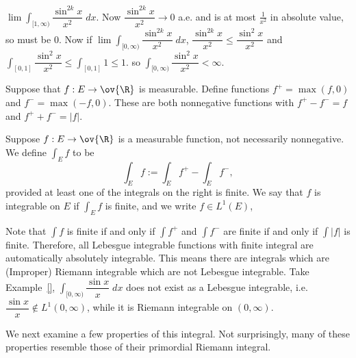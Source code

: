 \begin{ex}
$\lim \int_{[1,\infty)} \dfrac{\sin^{2k} x}{x^2} \; dx$. Now $\dfrac{\sin^{2k} x}{x^2} \to 0$ a.e. and is at most $\frac{1}{x^2}$ in absolute value, so must be 0. Now if $\lim \int_{[0,\infty)} \dfrac{\sin^{2k} x}{x^2} \; dx$, $\dfrac{\sin^{2k} x}{x^2} \leq \dfrac{\sin^2 x}{x^2}$ and $\int_{[0,1]} \dfrac{\sin^2 x}{x^2} \leq \int_{[0,1]} 1 \leq 1$. so $\int_{[0,\infty)} \dfrac{\sin^2 x}{x^2}< \infty$.
\end{ex}


















Suppose that $f: E \to \ov{\R}$ is measurable. Define functions $f^+= \max(f,0)$ and $f^-=\max(-f,0)$. These are both nonnegative functions with $f^+ - f^-=f$ and $f^+ + f^-= |f|$. 


\begin{dfn}
Suppose $f: E \to \ov{\R}$ is a measurable function, not necessarily nonnegative. We define $\int_E f$ to be
	\[
	\int_E f:= \int_E f^+ - \int_E f^-,
	\]
provided at least one of the integrals on the right is finite. We say that $f$ is integrable on $E$ if $\int_E f$ is finite, and we write $f \in L^1(E)$, 
\end{dfn}


\begin{rem}
Note that $\int f$ is finite if and only if $\int f^+$ and $\int f^-$ are finite if and only if $\int |f|$ is finite. Therefore, all Lebesgue integrable functions with finite integral are automatically absolutely integrable. This means there are integrals which are (Improper) Riemann integrable which are not Lebesgue integrable. Take Example~\ref{}, $\int_{[0,\infty)} \dfrac{\sin x}{x} \; dx$ does not exist as a Lebesgue integrable, i.e. $\dfrac{\sin x}{x} \notin L^1(0,\infty)$, while it is Riemann integrable on $(0,\infty)$. 
\end{rem}


We next examine a few properties of this integral. Not surprisingly, many of these properties resemble those of their primordial Riemann integral. 

